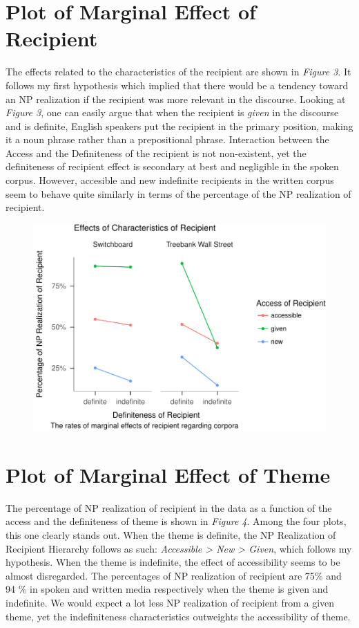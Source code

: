 \documentclass[english,floatsintext,man]{apa6}
\theoremstyle{definition}
\theoremstyle{definition}
\theoremstyle{definition}
\theoremstyle{remark}
\begin{document}
\section{Plot of Marginal Effect of
Recipient}\label{plot-of-marginal-effect-of-recipient}

The effects related to the characteristics of the recipient are shown in
\emph{Figure 3}. It follows my first hypothesis which implied that there
would be a tendency toward an NP realization if the recipient was more
relevant in the discourse. Looking at \emph{Figure 3}, one can easily
argue that when the recipient is \emph{given} in the discourse and is
definite, English speakers put the recipient in the primary position,
making it a noun phrase rather than a prepositional phrase. Interaction
between the Access and the Definiteness of the recipient is not
non-existent, yet the definiteness of recipient effect is secondary at
best and negligible in the spoken corpus. However, accesible and new
indefinite recipients in the written corpus seem to behave quite
similarly in terms of the percentage of the NP realization of recipient.

\begin{figure}
\centering
\includegraphics{papaja_files/figure-latex/rec_plots-1.pdf}
\caption{}
\end{figure}

\section{Plot of Marginal Effect of
Theme}\label{plot-of-marginal-effect-of-theme}

The percentage of NP realization of recipient in the data as a function
of the access and the definiteness of theme is shown in \emph{Figure 4}.
Among the four plots, this one clearly stands out. When the theme is
definite, the NP Realization of Recipient Hierarchy follows as such:
\emph{Accessible \textgreater{} New \textgreater{} Given}, which follows
my hypothesis. When the theme is indefinite, the effect of accessibility
seems to be almost disregarded. The percentages of NP realization of
recipient are 75\% and 94 \% in spoken and written media respectively
when the theme is given and indefinite. We would expect a lot less NP
realization of recipient from a given theme, yet the indefiniteness
characteristics outweights the accessibility of theme.
\end{document}
